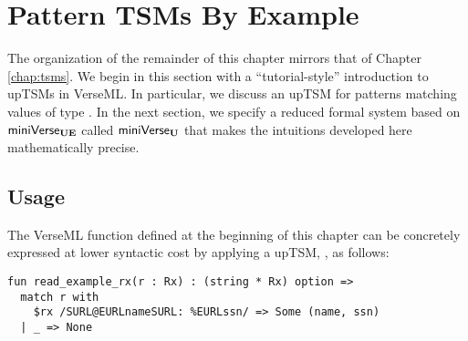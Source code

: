 \section{Pattern TSMs By Example}\label{sec:ptsms-by-example}
The organization of the remainder of this chapter mirrors that of Chapter \ref{chap:tsms}. We begin in this section with a ``tutorial-style'' introduction to upTSMs in VerseML. In particular, we  discuss an upTSM for patterns matching values of type . In the next section, we specify a reduced formal system based on $\mathsf{miniVerse}_\textbf{UE}$ called $\mathsf{miniVerse}_\textbf{U}$ that makes the intuitions developed here mathematically precise.

\subsection{Usage}\label{sec:ptsms-usage}
The VerseML function  defined at the beginning of this chapter can be concretely expressed at lower syntactic cost by applying a upTSM, , as follows:
\begin{lstlisting}
fun read_example_rx(r : Rx) : (string * Rx) option => 
  match r with 
    $rx /SURL@EURLnameSURL: %EURLssn/ => Some (name, ssn)
  | _ => None
\end{lstlisting}
